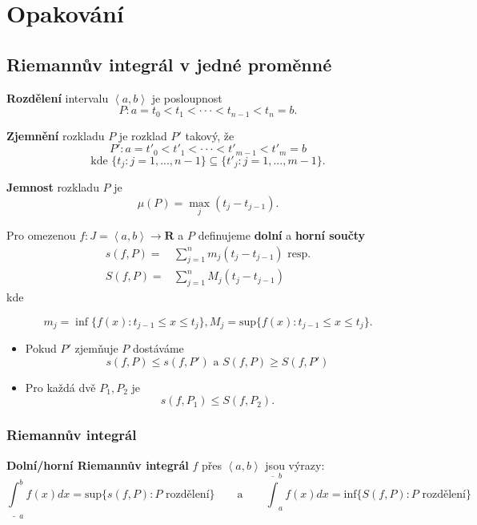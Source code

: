 \documentclass[../main.tex]{subfiles}
\begin{document}
\section{Opakování}
\subsection{Riemannův integrál v jedné proměnné}

\noindent
\textbf{Rozdělení} intervalu $\left<a,b\right>$ je posloupnost 
\[P : a = t_0 < t_1 < \cdot \cdot \cdot < t_{n-1} < t_n = b.\]

\noindent
\textbf{Zjemnění} rozkladu $P$ je rozklad $P'$ takový, že
	\[P' : a = t'_0 < t'_1 < \cdot \cdot \cdot < t'_{m-1} < t'_m = b\]
	\[\text{kde }\{t_j: j = 1,...,n-1\}\subseteq \{t'_j : j = 1,...,m-1\}.\] {
}

\noindent
\textbf{Jemnost} rozkladu $P$ je $$\mu(P) = \max_j(t_j-t_{j-1}).$$

\noindent
Pro omezenou $f:J=\left<a,b\right> \rightarrow \mathbf{R} $ a $P$ definujeme \textbf{dolní} a \textbf{horní součty}
\begin{align*}
    s(f,P) = & \sum^n_{j=1} m_j(t_j-t_{j-1}) \text{ resp.}\\
    S(f,P) = & \sum^n_{j=1} M_j(t_j-t_{j-1})
\end{align*}
kde

\[m_j = \inf\{f(x) : t_{j-1} \leq x \leq t_j\}, M_j = \text{sup}\{f(x) : t_{j-1} \leq x \leq t_j\}.\]

\begin{itemize}
    \item Pokud $P'$ zjemňuje $P$ dostáváme
    \[s(f,P) \leq s(f,P') \text{ a } S(f,P) \geq S(f,P')\]
    \item Pro každá dvě $P_1, P_2$ je 
    \[s(f,P_1) \leq S(f, P_2).\]
\end{itemize}

\subsubsection{Riemannův integrál}
\noindent
\textbf{Dolní/horní Riemannův integrál} $f$ přes $\left<a,b\right>$ jsou výrazy:
$$\underline{\int}^b_{ a} f(x)dx = \text{sup}\{s(f,P) : P \text{ rozdělení}\} \qquad \text{a}\qquad
\overline{\int}^b_{ a} f(x)dx = \text{inf}\{S(f,P) : P \text{ rozdělení}\}$$ 
\end{document}
